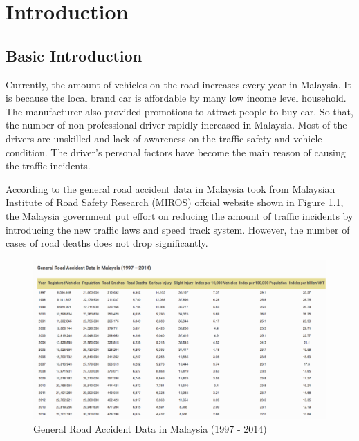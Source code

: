 \chapter{Introduction}
\section{Basic Introduction}
Currently, the amount of vehicles on the road increases every year in Malaysia.  
It is because the local brand car is affordable by many low income level household. The manufacturer also provided promotions to attract people to buy car. So that, the number of non-professional driver rapidly increased in Malaysia. Most of the drivers are unskilled and lack of awareness on the traffic safety and vehicle condition. The driver's personal factors have become the main reason of causing the traffic incidents.

According to the general road accident data in Malaysia took from Malaysian Institute of Road Safety Research (MIROS) offcial website shown in Figure \ref{fig:accident}, the Malaysia government put effort on reducing the amount of traffic incidents by introducing the new traffic laws and speed track system. However, the number of cases of road deaths does not drop significantly. 

\begin{figure}[hbt!]\centering
\includegraphics[width=.75\textwidth]{image/accident}
\caption{General Road Accident Data in Malaysia (1997 - 2014)}
\label{fig:accident}
\end{figure}

